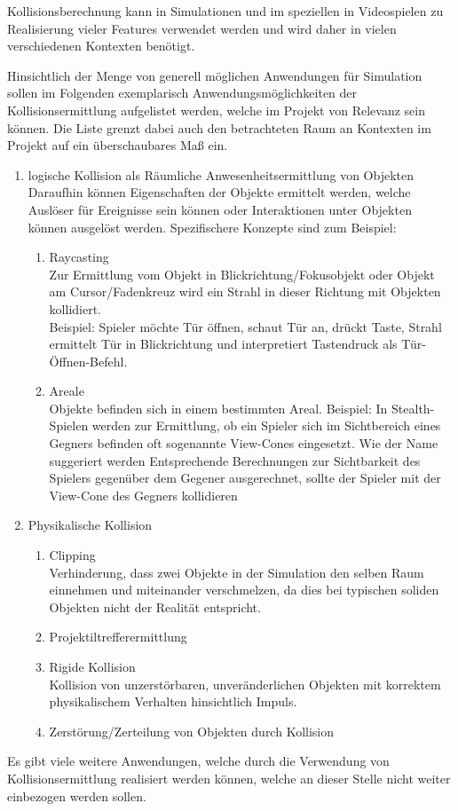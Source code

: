 \label{sec:usages}
Kollisionsberechnung kann in Simulationen und im speziellen in Videospielen zu Realisierung vieler Features verwendet werden und wird daher in vielen verschiedenen Kontexten benötigt. 

Hinsichtlich der Menge von generell möglichen Anwendungen für Simulation sollen im Folgenden exemplarisch Anwendungsmöglichkeiten der Kollisionsermittlung aufgelistet werden, welche im Projekt von Relevanz sein können. Die Liste grenzt dabei auch den betrachteten Raum an Kontexten im Projekt auf ein überschaubares Maß ein. 

\begin{enumerate}
	\item logische Kollision als Räumliche Anwesenheitsermittlung von Objekten\\
	Daraufhin können Eigenschaften der Objekte ermittelt werden, welche Auslöser für Ereignisse sein können oder Interaktionen unter Objekten können ausgelöst werden. Spezifischere Konzepte sind zum Beispiel: 
		\begin{enumerate}
			\item Raycasting\\
	Zur Ermittlung vom Objekt in Blickrichtung/Fokusobjekt oder Objekt am Cursor/Fadenkreuz wird ein Strahl in dieser Richtung mit Objekten kollidiert.\\
	Beispiel: Spieler möchte Tür öffnen, schaut Tür an, drückt Taste, Strahl ermittelt Tür in Blickrichtung und interpretiert Tastendruck als Tür-Öffnen-Befehl.
			\item Areale\\
	Objekte befinden sich in einem bestimmten Areal.
	Beispiel: In Stealth-Spielen werden zur Ermittlung, ob ein  Spieler sich im Sichtbereich eines Gegners befinden oft sogenannte View-Cones eingesetzt. Wie der Name suggeriert werden Entsprechende Berechnungen zur Sichtbarkeit des Spielers gegenüber dem Gegener ausgerechnet, sollte der Spieler mit der View-Cone des Gegners kollidieren
		\end{enumerate}

	\item Physikalische Kollision
		\begin{enumerate}
			\item Clipping\\
	Verhinderung, dass zwei Objekte in der Simulation den selben Raum einnehmen und miteinander verschmelzen, da dies bei typischen soliden Objekten nicht der Realität entspricht.
			\item Projektiltrefferermittlung
			\item Rigide Kollision\\
		Kollision von unzerstörbaren, unveränderlichen Objekten mit korrektem physikalischem Verhalten hinsichtlich Impuls.
			\item Zerstörung/Zerteilung von Objekten durch Kollision
		\end{enumerate}
\end{enumerate}

Es gibt viele weitere Anwendungen, welche durch die Verwendung von Kollisionsermittlung realisiert werden können, welche an dieser Stelle nicht weiter einbezogen werden sollen.

